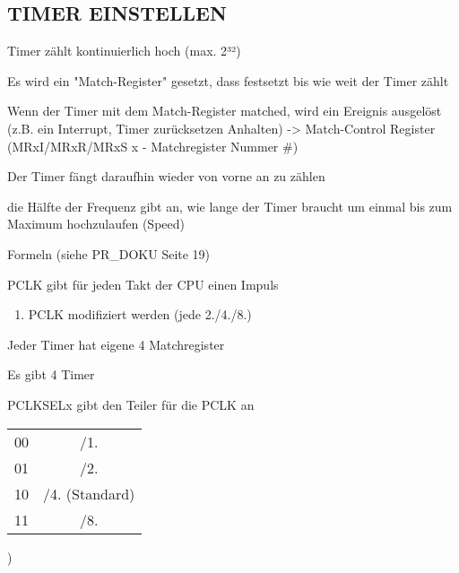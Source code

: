 \documentclass[11pt,a4paper,draft]{article}
\begin{document}
\subsection{TIMER EINSTELLEN}
\begin{list}{•}{}
\item Timer zählt kontinuierlich hoch (max. 2³²)
\item Es wird ein "Match-Register" gesetzt, dass festsetzt bis wie weit der Timer zählt
\item Wenn der Timer mit dem Match-Register matched, wird ein Ereignis ausgelöst (z.B. ein Interrupt, Timer zurücksetzen Anhalten) -> Match-Control Register (MRxI/MRxR/MRxS x - Matchregister Nummer \#)
\item Der Timer fängt daraufhin wieder von vorne an zu zählen

\item die Hälfte der Frequenz gibt an, wie lange der Timer braucht um einmal bis zum Maximum hochzulaufen (Speed)

\item Formeln (siehe PR\_DOKU Seite 19)
\item PCLK gibt für jeden Takt der CPU einen Impuls
\begin{enumerate}
\item PCLK modifiziert werden (jede 2./4./8.)
\end{enumerate}
\item Jeder Timer hat eigene 4 Matchregister
\item Es gibt 4 Timer

\item PCLKSELx gibt den Teiler für die PCLK an\\
\begin{tabular}{c | c}
00	& /1.\\
01	& /2.\\
10	& /4. (Standard)\\
11	& /8.
\end{tabular}										 )
\end{list}
\end{document}
